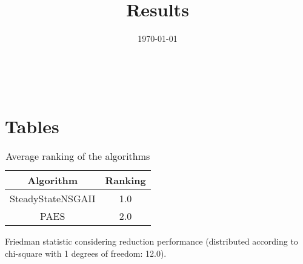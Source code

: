 \documentclass{article}
\title{Results}
\author{}
\date{\today}
\begin{document}
\oddsidemargin 0in \topmargin 0in\maketitle
\
\section{Tables}
\begin{table}[!htp]
\centering
\caption{Average ranking of the algorithms}
\begin{tabular}{c|c}
Algorithm&Ranking\\
\hline
SteadyStateNSGAII&1.0\\
PAES&2.0\\
\end{tabular}
\end{table}


Friedman statistic considering reduction performance (distributed according to chi-square with 1 degrees of freedom: 12.0).
\end{document}
